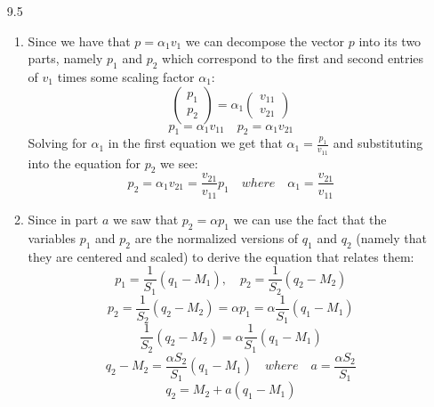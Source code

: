\documentclass[11pt,a4paper]{article}
\begin{document}
\begin{itemize}
\begin{enumerate} [label={\alph*)}]
 				\end{enumerate}
				
			\item[9.5]
				\begin{enumerate} [label={\alph*)}]
					\item Since we have that $p = \alpha_1 v_1$ we can decompose the vector $p$ into its two parts, namely $p_1$ and $p_2$ which correspond to the first and second entries of $v_1$ times some scaling factor $\alpha_1$:
					$$\begin{pmatrix} p_1 \\ p_2 \end{pmatrix}= \alpha_1 \begin{pmatrix} v_{11} \\ v_{21} \end{pmatrix}$$
					$$p_1 = \alpha_1 v_{11} \quad p_2 = \alpha_1 v_{21}$$
					Solving for $\alpha_1$ in the first equation we get that $\alpha_1=\frac{p_1}{v_{11}}$ and substituting into the equation for $p_2$ we see:
					$$p_2 = \alpha_1 v_{21} = \frac{v_{21}}{v_{11}}p_1 \quad where \quad \alpha_1 = \frac{v_{21}}{v_{11}}$$
					\item Since in part $a$ we saw that $p_2 = \alpha p_1$ we can use the fact that the variables $p_1$ and $p_2$ are the normalized versions of $q_1$ and $q_2$ (namely that they are centered and scaled) to derive the equation that relates them:
					$$p_1 = \frac{1}{S_1}(q_1 - M_1), \quad p_2 = \frac{1}{S_2}(q_2 - M_2)$$
					$$p_2 = \frac{1}{S_2}(q_2 - M_2) = \alpha p_1 = \alpha \frac{1}{S_1}(q_1 - M_1)$$
					$$\frac{1}{S_2}(q_2 - M_2) = \alpha \frac{1}{S_1}(q_1 - M_1)$$
					$$q_2 - M_2 = \frac{\alpha S_2}{S_1}(q_1 - M_1) \quad where \quad a = \frac{\alpha S_2}{S_1}$$
					$$q_2 = M_2 + a(q_1 - M_1)$$
				\end{enumerate}
				

\end{itemize}
\end{document}
